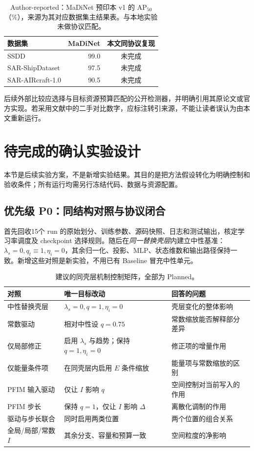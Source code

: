 \documentclass[UTF8,11pt,a4paper,fontset=fandol]{ctexart}
\newcommand{\ap}{\mathrm{AP}}
\begin{document}
\begin{table}[H]\centering\small
\caption{Author-reported：MaDiNet 预印本 v1 的 $\ap_{50}$（\%），来源为其对应数据集主结果表。与本地实验未做协议匹配。}
\label{tab:author}
\begin{tabular}{lrc}
\toprule
数据集 & MaDiNet & 本文同协议复现\\
\midrule
SSDD & 99.0 & 未完成\\
SAR-ShipDataset & 97.5 & 未完成\\
SAR-AIRcraft-1.0 & 90.5 & 未完成\\
\bottomrule
\end{tabular}
\end{table}
后续外部比较应选择与目标资源预算匹配的公开检测器，并明确引用其原论文或官方实现。若采用文献中的二手对比数字，应标注转引来源，不能让读者误认为由本文重新运行。
\FloatBarrier

\section{待完成的确认实验设计}\label{app:plan}
本节是后续实验方案，不是新增实验结果。其目的是把方法假设转化为明确控制和验收条件；所有运行均需另行冻结代码、数据与资源配置。

\subsection{优先级 P0：同结构对照与协议闭合}
首先回收15个 run 的原始划分、训练参数、源码快照、日志和测试输出，核定学习率调度及 checkpoint 选择规则。随后在\emph{同一替换壳层}内建立中性基准：$\lambda_s=0,q_t\equiv1,\eta_i=0$，其余归一化、投影、MLP、状态维数和输出路径保持一致。新增这些对照是新实验，不用已有 Baseline 冒充中性单元。

\begin{table}[H]\centering\small
\caption{建议的同壳层机制控制矩阵，全部为 Planned。}
\label{tab:planned-controls}
\begin{tabularx}{\linewidth}{P{3.0cm}P{4.6cm}Y}
\toprule
对照 & 唯一目标改动 & 回答的问题\\
\midrule
中性替换壳层 & $\lambda_s=0,q=1,\eta_i=0$ & 壳层变化的整体影响\\
常数驱动 & 相对中性设 $q=0.75$ & 常数缩放能否解释部分差异\\
仅局部修正 & 启用 $\lambda_s$ 与趋势；保持 $q=1,\eta_i=0$ & 修正项的增量作用\\
仅能量条件项 & 在同壳层内启用 $E$ 条件缩放 & 能量项与常数缩放的区别\\
PFIM 输入驱动 & 仅让 $I$ 影响 $q$ & 空间控制对当前写入的作用\\
PFIM 步长 & 保持 $q=1$，仅让 $I$ 影响 $\Delta$ & 离散化调制的作用\\
驱动与步长联合 & 同时启用两类位置 & 两个位置的组合关系\\
全局/局部/常数 $I$ & 其余分支、容量和预算一致 & 空间粒度的净影响\\
\bottomrule
\end{tabularx}
\end{table}
\end{document}
